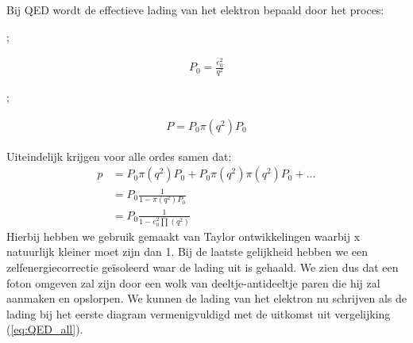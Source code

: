 \documentclass[../main.tex]{subfiles}
\begin{document}
Bij QED wordt de effectieve lading van het elektron bepaald door het proces:\\
\begin{minipage}[c]{0.5\textwidth}
    \begin{center}
        ;
    \end{center}
    \begin{equation}
        \begin{aligned}
            \label{eq:QED_eerste_orde}
            P_0 = \frac{e_0^2}{q^2}
        \end{aligned}
    \end{equation}
\end{minipage}\noindent
\begin{minipage}[c]{0.5\textwidth}
    \begin{center}
        ;
    \end{center}
    \begin{equation}
        \begin{aligned}
            \label{eq:QED_tweede_orde}
            P = P_0\pi(q^2)P_0
        \end{aligned}
    \end{equation}
\end{minipage}
Uiteindelijk krijgen voor alle ordes samen dat:
\begin{equation}
    \begin{aligned}
        \label{eq:QED_all}
        p&=P_0\pi(q^2)P_0+P_0\pi(q^2)\pi(q^2)P_0+...\\
         &=P_0 \frac{1}{1-\pi(q^2)P_0} \\
         &=P_0 \frac{1}{1-e_0^2\prod(q^2)} 
    \end{aligned}
\end{equation}
Hierbij hebben we gebruik gemaakt van Taylor ontwikkelingen waarbij x natuurlijk kleiner moet zijn dan 1. Bij de laatste gelijkheid hebben we een zelfenergiecorrectie geïsoleerd waar de lading uit is gehaald. We zien dus dat een foton omgeven zal zijn door een wolk van deeltje-antideeltje paren die hij zal aanmaken en opslorpen. We kunnen de lading van het elektron nu schrijven als de lading bij het eerste diagram vermenigvuldigd met de uitkomst uit vergelijking (\ref{eq:QED_all}).
\end{document}
